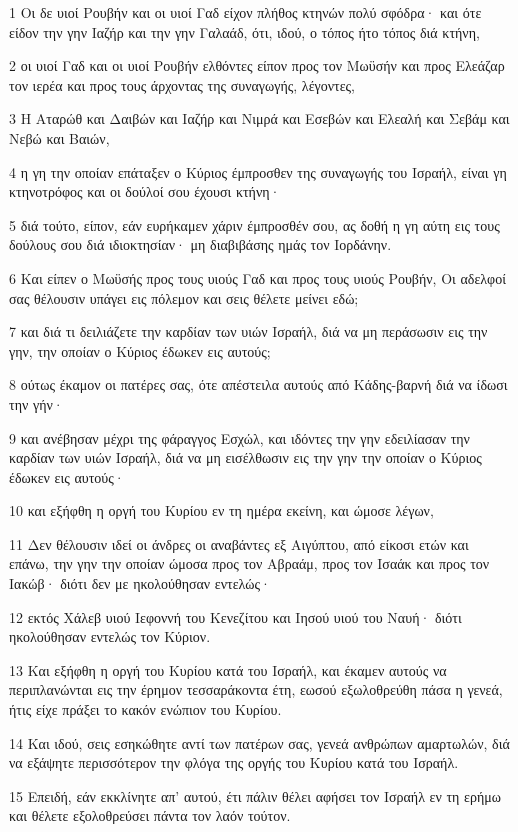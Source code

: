 \par 1 Οι δε υιοί Ρουβήν και οι υιοί Γαδ είχον πλήθος κτηνών πολύ σφόδρα· και ότε είδον την γην Ιαζήρ και την γην Γαλαάδ, ότι, ιδού, ο τόπος ήτο τόπος διά κτήνη,
\par 2 οι υιοί Γαδ και οι υιοί Ρουβήν ελθόντες είπον προς τον Μωϋσήν και προς Ελεάζαρ τον ιερέα και προς τους άρχοντας της συναγωγής, λέγοντες,
\par 3 Η Αταρώθ και Δαιβών και Ιαζήρ και Νιμρά και Εσεβών και Ελεαλή και Σεβάμ και Νεβώ και Βαιών,
\par 4 η γη την οποίαν επάταξεν ο Κύριος έμπροσθεν της συναγωγής του Ισραήλ, είναι γη κτηνοτρόφος και οι δούλοί σου έχουσι κτήνη·
\par 5 διά τούτο, είπον, εάν ευρήκαμεν χάριν έμπροσθέν σου, ας δοθή η γη αύτη εις τους δούλους σου διά ιδιοκτησίαν· μη διαβιβάσης ημάς τον Ιορδάνην.
\par 6 Και είπεν ο Μωϋσής προς τους υιούς Γαδ και προς τους υιούς Ρουβήν, Οι αδελφοί σας θέλουσιν υπάγει εις πόλεμον και σεις θέλετε μείνει εδώ;
\par 7 και διά τι δειλιάζετε την καρδίαν των υιών Ισραήλ, διά να μη περάσωσιν εις την γην, την οποίαν ο Κύριος έδωκεν εις αυτούς;
\par 8 ούτως έκαμον οι πατέρες σας, ότε απέστειλα αυτούς από Κάδης-βαρνή διά να ίδωσι την γήν·
\par 9 και ανέβησαν μέχρι της φάραγγος Εσχώλ, και ιδόντες την γην εδειλίασαν την καρδίαν των υιών Ισραήλ, διά να μη εισέλθωσιν εις την γην την οποίαν ο Κύριος έδωκεν εις αυτούς·
\par 10 και εξήφθη η οργή του Κυρίου εν τη ημέρα εκείνη, και ώμοσε λέγων,
\par 11 Δεν θέλουσιν ιδεί οι άνδρες οι αναβάντες εξ Αιγύπτου, από είκοσι ετών και επάνω, την γην την οποίαν ώμοσα προς τον Αβραάμ, προς τον Ισαάκ και προς τον Ιακώβ· διότι δεν με ηκολούθησαν εντελώς·
\par 12 εκτός Χάλεβ υιού Ιεφοννή του Κενεζίτου και Ιησού υιού του Ναυή· διότι ηκολούθησαν εντελώς τον Κύριον.
\par 13 Και εξήφθη η οργή του Κυρίου κατά του Ισραήλ, και έκαμεν αυτούς να περιπλανώνται εις την έρημον τεσσαράκοντα έτη, εωσού εξωλοθρεύθη πάσα η γενεά, ήτις είχε πράξει το κακόν ενώπιον του Κυρίου.
\par 14 Και ιδού, σεις εσηκώθητε αντί των πατέρων σας, γενεά ανθρώπων αμαρτωλών, διά να εξάψητε περισσότερον την φλόγα της οργής του Κυρίου κατά του Ισραήλ.
\par 15 Επειδή, εάν εκκλίνητε απ' αυτού, έτι πάλιν θέλει αφήσει τον Ισραήλ εν τη ερήμω και θέλετε εξολοθρεύσει πάντα τον λαόν τούτον.
